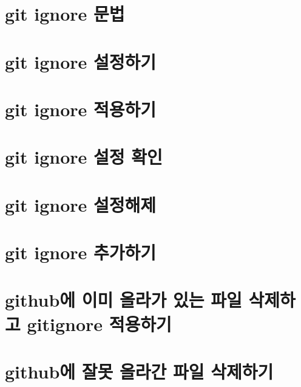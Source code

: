 \documentclass[12pt, a4paper, oneside]{book}
\let\stdsection\section
\renewcommand\section{\newpage\stdsection}
\begin{document}
	\section{git ignore 문법}

	\section{git ignore 설정하기}

	\section{git ignore 적용하기}

	\section{git ignore 설정 확인}

	\section{git ignore 설정해제}

	\section{git ignore 추가하기}

	\section{github에 이미 올라가 있는 파일 삭제하고 gitignore 적용하기}

	\section{github에 잘못 올라간 파일 삭제하기}
\end{document}
